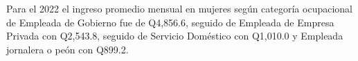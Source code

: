 Para el 2022 el ingreso promedio mensual en mujeres según categoría ocupacional de Empleada de Gobierno fue de Q4,856.6, seguido de Empleada de Empresa Privada con Q2,543.8, seguido de Servicio Doméstico con Q1,010.0 y Empleada jornalera o peón con Q899.2.